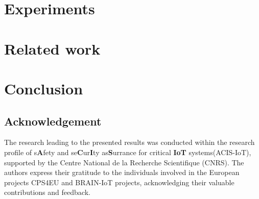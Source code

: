 \documentclass[3p,times,preprint,number,round]{elsarticle}
\theoremstyle{definition}
\newcommand{\acisiot} {s\textbf{A}fety and se\textbf{C}ur\textbf{I}ty as\textbf{S}urrance for critical \textbf{IoT} systems}
\begin{document}
\section{Experiments}\label{useCase}
\label{sec:useCase}
\begin{sloppypar}

\end{sloppypar}

\section{Related work}
\label{sec:rw}
\begin{sloppypar}

\end{sloppypar}

\section{Conclusion}\label{conclusion}
\begin{sloppypar}

\end{sloppypar}



\subsection*{Acknowledgement}
The research leading to the presented results was conducted within the research profile of \acisiot (ACIS-IoT), supported by the Centre National de la Recherche Scientifique (CNRS). The authors express their gratitude to the individuals involved in the European projects CPS4EU and BRAIN-IoT projects, acknowledging their valuable contributions and feedback.



%
%
%



\end{document}
